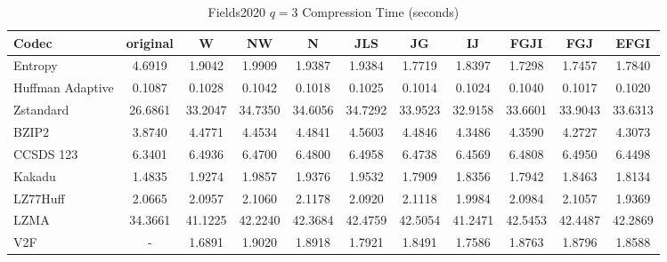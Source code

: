 \documentclass{article}
\begin{document}
\begin{table}[h!]
\centering
\caption{Fields2020 $q=3$ Compression Time (seconds)}
\begin{tabular}{|l|cccccccccc|}
\hline
Codec &  original &       W &      NW &       N &     JLS &      JG &      IJ &    FGJI &     FGJ &    EFGI \\
\hline
Entropy & 4.6919 & 1.9042 & 1.9909 & 1.9387 & 1.9384 & 1.7719 & 1.8397 & 1.7298 & 1.7457 & 1.7840         \\
\hline
Huffman Adaptive &    0.1087 &  0.1028 &  0.1042 &  0.1018 &  0.1025 &  0.1014 &  0.1024 &  0.1040 &  0.1017 &  0.1020 \\
Zstandard        &   26.6861 & 33.2047 & 34.7350 & 34.6056 & 34.7292 & 33.9523 & 32.9158 & 33.6601 & 33.9043 & 33.6313 \\
BZIP2            &    3.8740 &  4.4771 &  4.4534 &  4.4841 &  4.5603 &  4.4846 &  4.3486 &  4.3590 &  4.2727 &  4.3073 \\
CCSDS 123        &    6.3401 &  6.4936 &  6.4700 &  6.4800 &  6.4958 &  6.4738 &  6.4569 &  6.4808 &  6.4950 &  6.4498 \\
Kakadu           &    1.4835 &  1.9274 &  1.9857 &  1.9376 &  1.9532 &  1.7909 &  1.8356 &  1.7942 &  1.8463 &  1.8134 \\
LZ77Huff         &    2.0665 &  2.0957 &  2.1060 &  2.1178 &  2.0920 &  2.1118 &  1.9984 &  2.0984 &  2.1057 &  1.9369 \\
LZMA             &   34.3661 & 41.1225 & 42.2240 & 42.3684 & 42.4759 & 42.5054 & 41.2471 & 42.5453 & 42.4487 & 42.2869 \\
V2F              &    - &  1.6891 &  1.9020 &  1.8918 &  1.7921 &  1.8491 &  1.7586 &  1.8763 &  1.8796 &  1.8588 \\
\hline
\end{tabular}
\end{table}

\newpage
\end{document}
